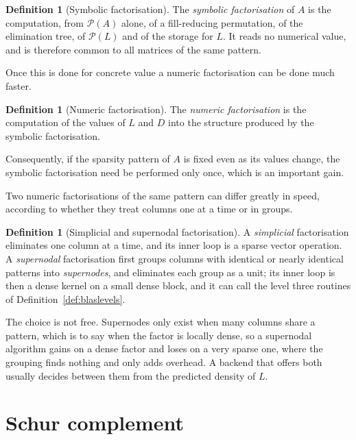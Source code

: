 \documentclass[a4paper,11pt]{book}
\theoremstyle{plain}
\theoremstyle{definition}
\newtheorem{definition}[theorem]{Definition}
\theoremstyle{remark}
\numberwithin{equation}{chapter}
\numberwithin{algorithm}{chapter}
\begin{document}
	
	\begin{definition}[Symbolic factorisation]\label{def:symbolic}
		The \emph{symbolic factorisation} of $A$ is the computation, from
		$\mathcal{P}(A)$ alone, of a fill-reducing permutation, of the elimination
		tree, of $\mathcal{P}(L)$ and of the storage for $L$. It reads no numerical
		value, and is therefore common to all matrices of the same pattern.
	\end{definition}
	
	Once this is done for concrete value a numeric factorisation can be done much faster.
	\begin{definition}[Numeric factorisation]\label{def:numeric}
		The \emph{numeric factorisation} is the computation of the values of $L$ and
		$D$ into the structure produced by the symbolic factorisation.
	\end{definition}


Consequently, if the sparsity pattern of $A$ is fixed even as its values
change, the symbolic factorisation need be performed only once, which is an
important gain.

	Two numeric factorisations of the same pattern can differ greatly in speed,
	according to whether they treat columns one at a time or in groups.

	\begin{definition}[Simplicial and supernodal factorisation]
		\label{def:supernodal}
		A \emph{simplicial} factorisation eliminates one column at a time, and its
		inner loop is a sparse vector operation. A \emph{supernodal} factorisation
		first groups columns with identical or nearly identical patterns into
		\emph{supernodes}, and eliminates each group as a unit; its inner loop is
		then a dense kernel on a small dense block, and it can call the level three
		routines of Definition~\ref{def:blaslevels}.
	\end{definition}

	The choice is not free. Supernodes only exist when many columns share a
	pattern, which is to say when the factor is locally dense, so a supernodal
	algorithm gains on a dense factor and loses on a very sparse one, where the
	grouping finds nothing and only adds overhead. A backend that offers both
	usually decides between them from the predicted density of $L$.

	
	
	
	\section{Schur complement}
	
\end{document}
